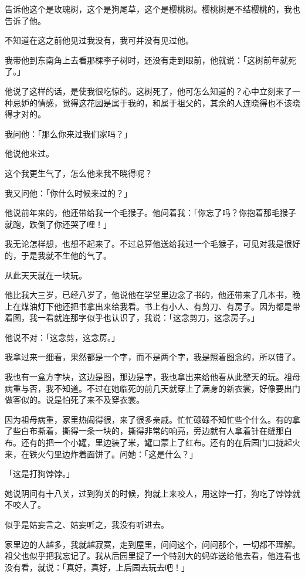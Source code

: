 \documentclass[UTF8]{ctexart}
\begin{document}
告诉他这个是玫瑰树，这个是狗尾草，这个是樱桃树。樱桃树是不结樱桃的，我也告诉了他。

不知道在这之前他见过我没有，我可并没有见过他。

我带他到东南角上去看那棵李子树时，还没有走到眼前，他就说：「这树前年就死了。」

他说了这样的话，是使我很吃惊的。这树死了，他可怎么知道的？心中立刻来了一种忌妒的情感，觉得这花园是属于我的，和属于祖父的，其余的人连晓得也不该晓得才对的。

我问他：「那么你来过我们家吗？」

他说他来过。

这个我更生气了，怎么他来我不晓得呢？

我又问他：「你什么时候来过的？」

他说前年来的，他还带给我一个毛猴子。他问着我：「你忘了吗？你抱着那毛猴子就跑，跌倒了你还哭了哩！」

我无论怎样想，也想不起来了。不过总算他送给我过一个毛猴子，可见对我是很好的，于是我就不生他的气了。

从此天天就在一块玩。

他比我大三岁，已经八岁了，他说他在学堂里边念了书的，他还带来了几本书，晚上在煤油灯下他还把书拿出来给我看。书上有小人、有剪刀、有房子。因为都是带着图，我一看就连那字似乎也认识了，我说：「这念剪刀，这念房子。」

他说不对：「这念剪，这念房。」

我拿过来一细看，果然都是一个字，而不是两个字，我是照着图念的，所以错了。

我也有一盒方字块，这边是图，那边是字，我也拿出来给他看从此整天的玩。祖母病重与否，我不知道。不过在她临死的前几天就穿上了满身的新衣裳，好像要出门做客似的。说是怕死了来不及穿衣裳。

因为祖母病重，家里热闹得很，来了很多亲戚。忙忙碌碌不知忙些个什么。有的拿了些白布撕着，撕得一条一块的，撕得非常的响亮，旁边就有人拿着针在缝那白布。还有的把一个小罐，里边装了米，罐口蒙上了红布。还有的在后园门口拢起火来，在铁火勺里边炸着面饼了。问她：「这是什么？」

「这是打狗饽饽。」

她说阴间有十八关，过到狗关的时候，狗就上来咬人，用这饽一打，狗吃了饽饽就不咬人了。

似乎是姑妄言之、姑妄听之，我没有听进去。

家里边的人越多，我就越寂寞，走到屋里，问问这个，问问那个，一切都不理解。祖父也似乎把我忘记了。我从后园里捉了一个特别大的蚂蚱送给他去看，他连看也没有看，就说：「真好，真好，上后园去玩去吧！」
\end{document}
